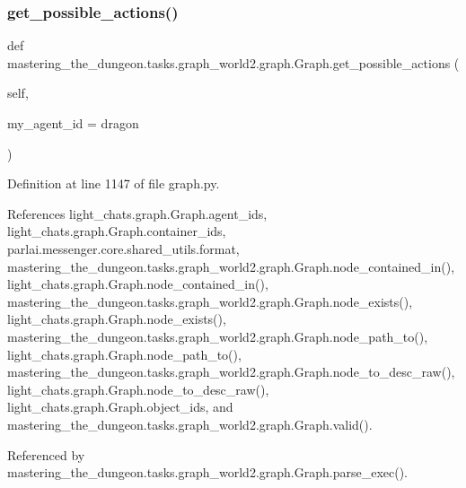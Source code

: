 \subsubsection{\texorpdfstring{get\+\_\+possible\+\_\+actions()}{get\_possible\_actions()}}
{\footnotesize\ttfamily def mastering\+\_\+the\+\_\+dungeon.\+tasks.\+graph\+\_\+world2.\+graph.\+Graph.\+get\+\_\+possible\+\_\+actions (\begin{DoxyParamCaption}\item[{}]{self,  }\item[{}]{my\+\_\+agent\+\_\+id = {\ttfamily \textquotesingle{}dragon\textquotesingle{}} }\end{DoxyParamCaption})}



Definition at line 1147 of file graph.\+py.



References light\+\_\+chats.\+graph.\+Graph.\+agent\+\_\+ids, light\+\_\+chats.\+graph.\+Graph.\+container\+\_\+ids, parlai.\+messenger.\+core.\+shared\+\_\+utils.\+format, mastering\+\_\+the\+\_\+dungeon.\+tasks.\+graph\+\_\+world2.\+graph.\+Graph.\+node\+\_\+contained\+\_\+in(), light\+\_\+chats.\+graph.\+Graph.\+node\+\_\+contained\+\_\+in(), mastering\+\_\+the\+\_\+dungeon.\+tasks.\+graph\+\_\+world2.\+graph.\+Graph.\+node\+\_\+exists(), light\+\_\+chats.\+graph.\+Graph.\+node\+\_\+exists(), mastering\+\_\+the\+\_\+dungeon.\+tasks.\+graph\+\_\+world2.\+graph.\+Graph.\+node\+\_\+path\+\_\+to(), light\+\_\+chats.\+graph.\+Graph.\+node\+\_\+path\+\_\+to(), mastering\+\_\+the\+\_\+dungeon.\+tasks.\+graph\+\_\+world2.\+graph.\+Graph.\+node\+\_\+to\+\_\+desc\+\_\+raw(), light\+\_\+chats.\+graph.\+Graph.\+node\+\_\+to\+\_\+desc\+\_\+raw(), light\+\_\+chats.\+graph.\+Graph.\+object\+\_\+ids, and mastering\+\_\+the\+\_\+dungeon.\+tasks.\+graph\+\_\+world2.\+graph.\+Graph.\+valid().



Referenced by mastering\+\_\+the\+\_\+dungeon.\+tasks.\+graph\+\_\+world2.\+graph.\+Graph.\+parse\+\_\+exec().

